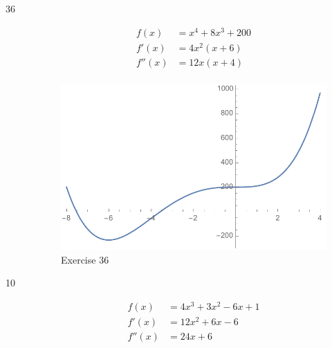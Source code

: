 \documentclass[letterpaper, landscape]{exam}
\begin{document}
  \begin{description}
    \item[36]
      \begin{align*}
        f(x)   & = x^4 + 8x^3 + 200 \\
        f'(x)  & = 4x^2 (x + 6) \\
        f''(x) & = 12x (x + 4) \\
      \end{align*}


      \begin{figure}[H]
        \centering
        \includegraphics[scale = 0.6]{ex43_36.pdf}
        \caption{Exercise 36}
        \label{fig:ex_4.3_36}
      \end{figure}
      
    \newpage

    \item[10]
      \begin{align*}
        f(x)   & = 4x^3 + 3x^2 -6x + 1 \\
        f'(x)  & = 12x^2 + 6x - 6 \\
        f''(x) & = 24x + 6 \\
      \end{align*}


\end{description}
\end{document}
